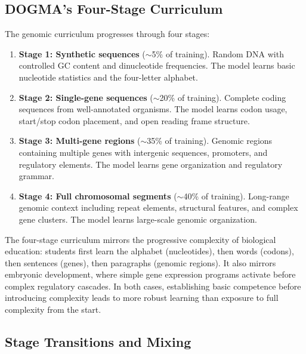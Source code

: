 \subsection{DOGMA's Four-Stage Curriculum}
\label{sec:four-stage-curriculum}

\begin{dogmadef}
The genomic curriculum progresses through four stages:
\begin{enumerate}[leftmargin=1.5em]
  \item \textbf{Stage 1: Synthetic sequences} ($\sim$5\% of training). Random DNA with controlled GC content and dinucleotide frequencies. The model learns basic nucleotide statistics and the four-letter alphabet.

  \item \textbf{Stage 2: Single-gene sequences} ($\sim$20\% of training). Complete coding sequences from well-annotated organisms. The model learns codon usage, start/stop codon placement, and open reading frame structure.

  \item \textbf{Stage 3: Multi-gene regions} ($\sim$35\% of training). Genomic regions containing multiple genes with intergenic sequences, promoters, and regulatory elements. The model learns gene organization and regulatory grammar.

  \item \textbf{Stage 4: Full chromosomal segments} ($\sim$40\% of training). Long-range genomic context including repeat elements, structural features, and complex gene clusters. The model learns large-scale genomic organization.
\end{enumerate}
\end{dogmadef}

\begin{bioinsight}
The four-stage curriculum mirrors the progressive complexity of biological education: students first learn the alphabet (nucleotides), then words (codons), then sentences (genes), then paragraphs (genomic regions). It also mirrors embryonic development, where simple gene expression programs activate before complex regulatory cascades. In both cases, establishing basic competence before introducing complexity leads to more robust learning than exposure to full complexity from the start.
\end{bioinsight}

\subsection{Stage Transitions and Mixing}

